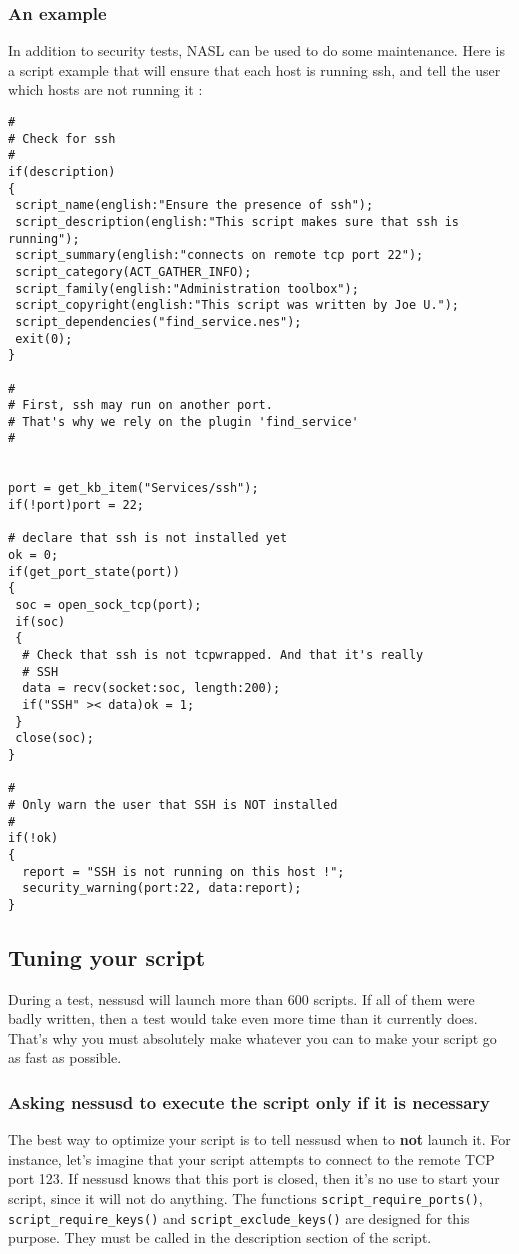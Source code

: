 \documentclass{article}
\begin{document}
\subsubsection{An example}

In addition to security tests, NASL can be used to do some maintenance.
Here is a script example that will ensure that each host is running
ssh, and tell the user which hosts are not running it :
\begin{verbatim}
#
# Check for ssh
#
if(description)
{
 script_name(english:"Ensure the presence of ssh");
 script_description(english:"This script makes sure that ssh is running");
 script_summary(english:"connects on remote tcp port 22");
 script_category(ACT_GATHER_INFO);
 script_family(english:"Administration toolbox");
 script_copyright(english:"This script was written by Joe U.");
 script_dependencies("find_service.nes");
 exit(0);
}

#
# First, ssh may run on another port. 
# That's why we rely on the plugin 'find_service'
#


port = get_kb_item("Services/ssh");
if(!port)port = 22;

# declare that ssh is not installed yet
ok = 0;
if(get_port_state(port))
{
 soc = open_sock_tcp(port);
 if(soc)
 {
  # Check that ssh is not tcpwrapped. And that it's really
  # SSH
  data = recv(socket:soc, length:200);
  if("SSH" >< data)ok = 1;
 }
 close(soc);
}

#
# Only warn the user that SSH is NOT installed
#  
if(!ok)
{
  report = "SSH is not running on this host !";
  security_warning(port:22, data:report);
}
\end{verbatim}


\subsection{Tuning your script}

During a test, nessusd will launch more than 600 scripts. If all of them were badly written, then a test would take even more time than it currently does. That's why you must absolutely make whatever you can to make your script go as fast as possible. 

\subsubsection{Asking nessusd to execute the script only if it is necessary}

The best way to optimize your script is to tell nessusd when to \textbf{not} launch it. For instance, let's imagine that your script attempts to connect to the remote TCP port 123. If nessusd knows that this port is closed, then it's no use to start your script, since it will not do anything. The functions \verb+script_require_ports()+, \verb+script_require_keys()+ and \verb+script_exclude_keys()+ are designed for this purpose. They must be called in the description section of the script.
\end{document}
